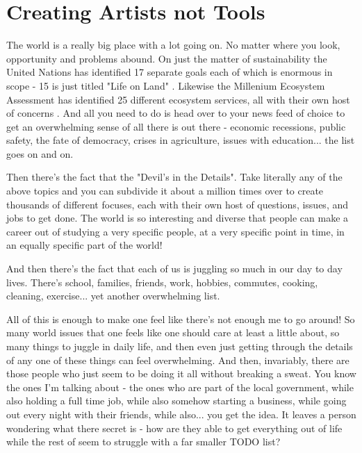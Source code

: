 \documentclass[11pt,a5paper]{book}
\begin{document}
\chapter{Creating Artists not Tools}
The world is a really big place with a lot going on. No matter where you look, opportunity and problems abound. On just the matter of sustainability the United Nations has identified 17 separate goals each of which is enormous in scope - 15 is just titled "Life on Land" \cite{united}. Likewise the Millenium Ecosystem Assessment has identified 25 different ecosystem services, all with their own host of concerns \cite{mas}. And all you need to do is head over to your news feed of choice to get an overwhelming sense of all there is out there - economic recessions, public safety, the fate of democracy, crises in agriculture, issues with education... the list goes on and on.
\newline

Then there's the fact that the "Devil's in the Details". Take literally any of the above topics and you can subdivide it about a million times over to create thousands of different focuses, each with their own host of questions, issues, and jobs to get done. The world is so interesting and diverse that people can make a career out of studying a very specific people, at a very specific point in time, in an equally specific part of the world! 
\newline

And then there's the fact that each of us is juggling so much in our day to day lives. There's school, families, friends, work, hobbies, commutes, cooking, cleaning, exercise... yet another overwhelming list. 
\newline

All of this is enough to make one feel like there's not enough me to go around! So many world issues that one feels like one should care at least a little about, so many things to juggle in daily life, and then even just getting through the details of any one of these things can feel overwhelming. And then, invariably, there are those people who just seem to be doing it all without breaking a sweat. You know the ones I'm talking about - the ones who are part of the local government, while also holding a full time job, while also somehow starting a business, while going out every night with their friends, while also... you get the idea. It leaves a person wondering what there secret is - how are they able to get everything out of life while the rest of seem to struggle with a far smaller TODO list?
\newline
\end{document}
